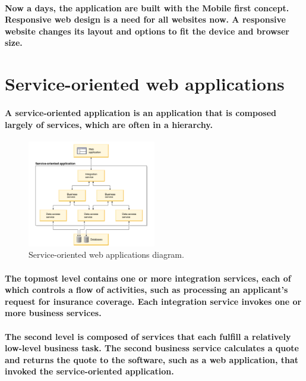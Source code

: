 \documentclass[12pt,a4paper]{article}
\begin{document}
    \paragraph{Now a days, the application are built with the Mobile first concept. Responsive web design is a need for all websites now. A responsive website changes its layout and options to fit the device and browser size.
    }

    \section{Service-oriented web applications}

    \paragraph{A service-oriented application is an application that is composed largely of services, which are often in a hierarchy.}

    \begin{figure}[h!]
      \centering
      \includegraphics[width=0.5\textwidth]{diagrama.png}
      \caption{Service-oriented web applications diagram.}
    \end{figure}

    \paragraph{The topmost level contains one or more integration services, each of which controls a flow of activities, such as processing an applicant's request for insurance coverage. Each integration service invokes one or more business services.
    }

    \paragraph{The second level is composed of services that each fulfill a relatively low-level business task. The second business service calculates a quote and returns the quote to the software, such as a web application, that invoked the service-oriented application.
    }
\end{document}
